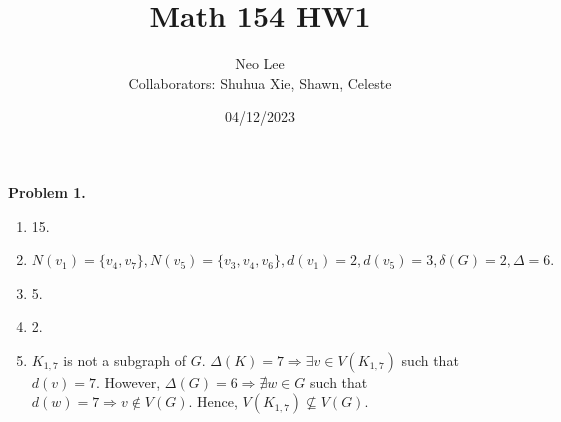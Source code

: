 \documentclass{article}
\title{Math 154 HW1}
\author{Neo Lee\\[3mm]Collaborators: Shuhua Xie, Shawn, Celeste}
\date{04/12/2023}
\begin{document}
 

\maketitle 

\textbf{Problem 1.}
\begin{enumerate}[label=(\alph*)]
    \item 15.
    \item $N(v_1) = \{v_4, v_7\}, N(v_5) = \{v_3,v_4,v_6\}, d(v_1) = 2, d(v_5) = 3, \delta(G) = 2, \Delta = 6.$
    \item 5.
    \item 2.
    \item $K_{1,7}$ is not a subgraph of $G$. $\Delta(K) = 7 \Rightarrow \exists v \in V(K_{1,7})$ such that $d(v) = 7$.
    However, $\Delta(G) = 6 \Rightarrow \nexists w \in G$ such that $d(w) = 7 \Rightarrow v\not\in V(G)$.
    Hence, $V(K_{1,7}) \nsubseteq V(G)$.
\end{enumerate}
\bigbreak
\end{document}
